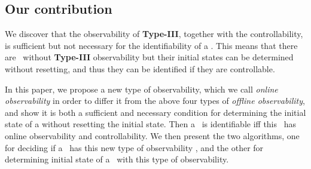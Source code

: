 \subsection{Our contribution}
We discover that the observability of {\bf Type-III}, together with the controllability,  is  sufficient but not necessary for the identifiability of a {\BCN}. This means that there are \BCNs\  without {\bf Type-III} observability but their initial states can be determined without  resetting, and thus they can be identified if they are controllable.

In this paper, we propose a new type of observability, which we call {\em online observability} in order to differ it from the above four types  of {\em  offline observability}, and show it is both a sufficient and necessary condition for determining the initial state of a {\BCN} without resetting the initial state. Then a \BCN\ is identifiable iff this \BCN\ has online observability and controllability. We then present the two algorithms, one for deciding if a \BCN\ has this new type of observability , and the other for determining  initial state of a \BCN\ with this type of observability. 





